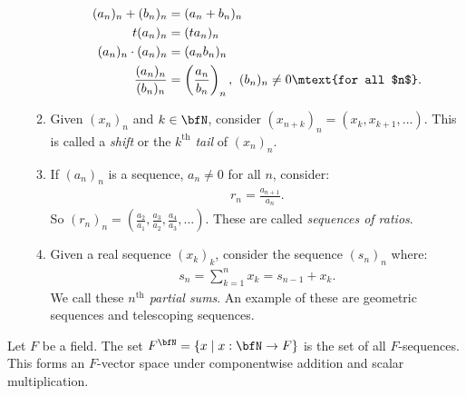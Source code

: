 \begin{example}
\begin{enumerate}[label = (\arabic*)]
\begin{enumerate}[label = (\roman*)]
\begin{equation*}
\begin{split}
                            (a_n)_n + (b_n)_n &= (a_n + b_n)_n \\
                            t(a_n)_n &= (ta_n)_n \\
                            (a_n)_n \cdot (a_n)_n &= (a_n b_n)_n \\
                            \frac{(a_n)_n}{(b_n)_n} &= \left(\frac{a_n}{b_n}\right)_n, \hspace{4pt} (b_n)_n \neq 0 \mtext{for all $n$}.
                        \end{split}
                        \end{equation*}
                    \item Given $(x_n)_n$ and $k \in \bfN$, consider $(x_{n+k})_n = (x_k,x_{k+1},...)$. This is called a \textit{shift} or the \textit{$k^\text{th}$ tail} of $(x_n)_n$.
                    \item If $(a_n)_n$ is a sequence, $a_n \neq 0$ for all $n$, consider:
                        \begin{equation*}
                        \begin{split}
                            r_n = \frac{a_{n+1}}{a_n}.
                        \end{split}
                        \end{equation*}
                    So $(r_n)_n = \left(\frac{a_2}{a_1},\frac{a_3}{a_2},\frac{a_4}{a_3},...\right)$. These are called \textit{sequences of ratios}.
                    \item Given a real sequence $(x_k)_k$, consider the sequence $(s_n)_n$ where:
                        \begin{equation*}
                        \begin{split}
                            s_n = \sum_{k=1}^n x_k = s_{n-1} + x_k.
                        \end{split}
                        \end{equation*}
                    We call these \textit{$n^\text{th}$ partial sums}. An example of these are geometric sequences and telescoping sequences.
                \end{enumerate}
        \end{enumerate}
    \end{example}

    \begin{example}
        Let $F$ be a field. The set $F^\bfN = \{x\mid x:\bfN \rightarrow F\}$ is the set of all $F$-sequences. This forms an $F$-vector space under componentwise addition and scalar multiplication.
    \end{example}

